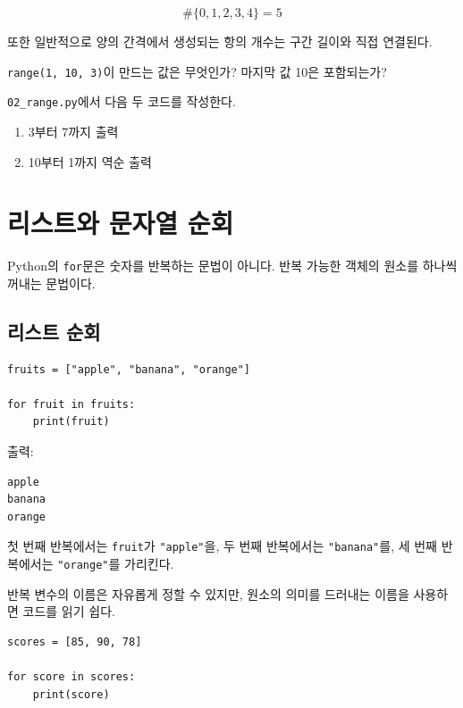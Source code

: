 \documentclass[11pt,a4paper]{article}
\begin{document}
\[
\#\{0,1,2,3,4\}=5
\]

또한 일반적으로 양의 간격에서 생성되는 항의 개수는 구간 길이와 직접 연결된다.

\begin{checkpointbox}
\texttt{range(1, 10, 3)}이 만드는 값은 무엇인가? 마지막 값 10은 포함되는가?
\end{checkpointbox}

\begin{practicebox}
\texttt{02\_range.py}에서 다음 두 코드를 작성한다.
\begin{enumerate}
    \item 3부터 7까지 출력
    \item 10부터 1까지 역순 출력
\end{enumerate}
\end{practicebox}

\section{리스트와 문자열 순회}

Python의 \texttt{for}문은 숫자를 반복하는 문법이 아니다. 반복 가능한 객체의 원소를 하나씩 꺼내는 문법이다.

\subsection{리스트 순회}

\begin{lstlisting}
fruits = ["apple", "banana", "orange"]

for fruit in fruits:
    print(fruit)
\end{lstlisting}

출력:

\begin{verbatim}
apple
banana
orange
\end{verbatim}

첫 번째 반복에서는 \texttt{fruit}가 \texttt{"apple"}을, 두 번째 반복에서는 \texttt{"banana"}를, 세 번째 반복에서는 \texttt{"orange"}를 가리킨다.

반복 변수의 이름은 자유롭게 정할 수 있지만, 원소의 의미를 드러내는 이름을 사용하면 코드를 읽기 쉽다.

\begin{lstlisting}
scores = [85, 90, 78]

for score in scores:
    print(score)
\end{lstlisting}
\end{document}

